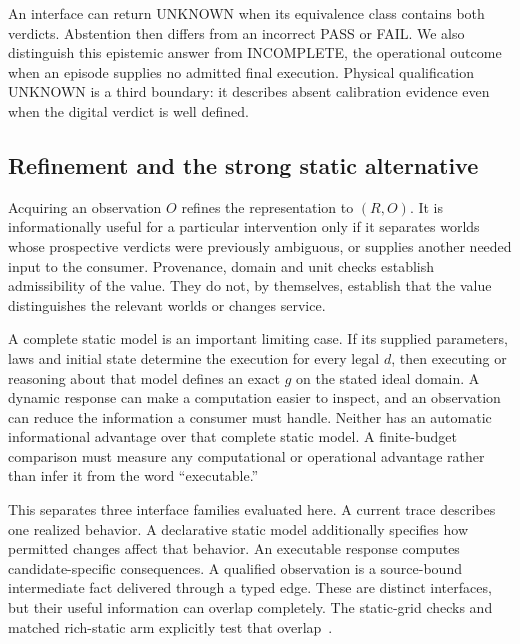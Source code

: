 An interface can return UNKNOWN when its equivalence class contains both
verdicts. Abstention then differs from an incorrect PASS or FAIL. We also
distinguish this epistemic answer from INCOMPLETE, the operational outcome
when an episode supplies no admitted final execution. Physical qualification
UNKNOWN is a third boundary: it describes absent calibration evidence even
when the digital verdict is well defined.

\subsection{Refinement and the strong static alternative}
Acquiring an observation $O$ refines the representation to $(R,O)$. It is
informationally useful for a particular intervention only if it separates
worlds whose prospective verdicts were previously ambiguous, or supplies
another needed input to the consumer. Provenance, domain and unit checks
establish admissibility of the value. They do not, by themselves, establish
that the value distinguishes the relevant worlds or changes service.

A complete static model is an important limiting case. If its supplied
parameters, laws and initial state determine the execution for every legal
$d$, then executing or reasoning about that model defines an exact $g$ on
the stated ideal domain. A dynamic response can make a computation easier
to inspect, and an observation can reduce the information a consumer must
handle. Neither has an automatic informational advantage over that complete
static model. A finite-budget comparison must measure any computational or
operational advantage rather than infer it from the word ``executable.''

This separates three interface families evaluated here. A current trace
describes one realized behavior. A declarative static model additionally
specifies how permitted changes affect that behavior. An executable response
computes candidate-specific consequences. A qualified observation is a
source-bound intermediate fact delivered through a typed edge. These are
distinct interfaces, but their useful information can overlap completely.
The static-grid checks and matched rich-static arm explicitly test that
overlap~\cite{structural,tables}.


